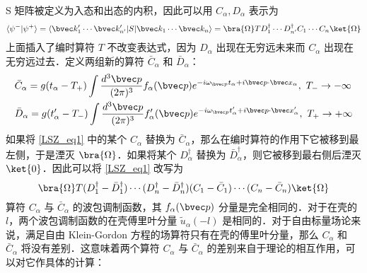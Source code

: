 S 矩阵被定义为入态和出态的内积，因此可以用 $C_\alpha,D_\alpha$ 表示为
\begin{equation}\label{LSZ_eq1} \begin{aligned}
\langle\psi^-|\psi^+\rangle=\langle\bvec k'_1 \cdots \bvec k'_{n'}|S|\bvec k_1\cdots\bvec k_n\rangle=\bra{\Omega} T D_1^\dagger \cdots D_{n'}^\dagger C_1\cdots C_n \ket{\Omega}
\end{aligned}\end{equation} 
上面插入了编时算符 $T$ 不改变表达式，因为 $D_\alpha$ 出现在无穷远未来而 $C_\alpha$ 出现在无穷远过去．定义两组新的算符 $\bar C_\alpha$ 和 $\bar D_\alpha$：
\begin{equation} \begin{aligned}
&\bar C_\alpha=g(t_\alpha-T_+)\int \frac{d^3{\bvec p}}{(2\pi)^3} f_\alpha(\bvec p)e^{-i\omega_{\bvec p}t_\alpha+i\bvec p\cdot \bvec x_\alpha},\ T_-\rightarrow -\infty\\
&\bar D_\alpha=g(t'_\alpha-T_-)\int \frac{d^3{\bvec p}}{(2\pi)^3} f'_\alpha(\bvec p)e^{-i\omega_{\bvec p}t'_\alpha+i\bvec p\cdot \bvec x'_\alpha},\ T_+\rightarrow +\infty
\end{aligned}\end{equation}
如果将 \autoref{LSZ_eq1}  中的某个 $C_\alpha$ 替换为 $\bar{C}_\alpha$，那么在编时算符的作用下它被移到最左侧，于是湮灭 $\bra{\Omega}$．如果将某个 $D_\alpha^\dagger$ 替换为 $\bar{D}_\alpha^\dagger$，则它被移到最右侧后湮灭 $\ket{0}$．因此可以将 \autoref{LSZ_eq1}  改写为
\[
\bra{\Omega} T (D_1^\dagger-\bar{D}_1^\dagger) \cdots (D_n^\dagger-\bar{D}_n^\dagger) (C_1-\bar{C}_1)\cdots (C_n-\bar{C}_n) \ket{\Omega}
\]
算符 $C_\alpha$ 与 $\bar{C}_\alpha$ 的波包调制函数，其 $f_\alpha(\bvec p)$ 分量是完全相同的．对于在壳的 $l$，两个波包调制函数的在壳傅里叶分量 $\tilde{u}_\alpha(-l)$ 是相同的．对于自由标量场论来说，满足自由 Klein-Gordon 方程的场算符只有在壳的傅里叶分量，那么 $C_\alpha$ 和 $\bar{C}_\alpha$ 将没有差别．这意味着两个算符 $C_\alpha$ 与 $\bar{C}_\alpha$ 的差别来自于理论的相互作用，可以对它作具体的计算：
